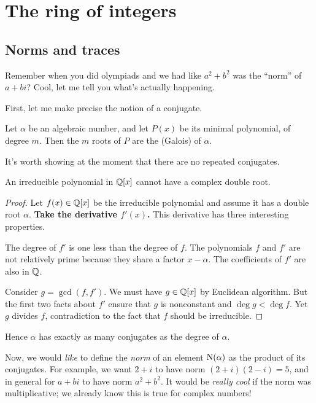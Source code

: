 \chapter{The ring of integers}
\label{ch:ring_of_integers}
\section{Norms and traces}
\label{sec:norms_traces}
Remember when you did olympiads and we had like $a^2+b^2$ was the ``norm'' of $a+bi$?
Cool, let me tell you what's actually happening.

First, let me make precise the notion of a conjugate.
\begin{definition}
	Let $\alpha$ be an algebraic number, and let $P(x)$ be its minimal polynomial,
	of degree $m$.
	Then the $m$ roots of $P$ are the (Galois)  of $\alpha$.
\end{definition}
It's worth showing at the moment that there are no repeated conjugates.
\begin{lemma}
	An irreducible polynomial in $\mathbb Q[x]$ cannot have a complex double root.
	\label{lem:irred_complex}
\end{lemma}
\begin{proof}
	Let $f(x) \in \mathbb Q[x]$ be the irreducible polynomial and assume it has a double root $\alpha$.
	\textbf{Take the derivative $f'(x)$.}
	This derivative has three interesting properties.
	\begin{itemize}
		\ii The degree of $f'$ is one less than the degree of $f$.
		\ii The polynomials $f$ and $f'$ are not relatively prime
		because they share a factor $x-\alpha$.
		\ii The coefficients of $f'$ are also in $\mathbb Q$.
	\end{itemize}
	Consider $g = \gcd(f, f')$. We must have $g \in \mathbb Q[x]$ by Euclidean algorithm.
	But the first two facts about $f'$ ensure that $g$ is nonconstant
	and $\deg g < \deg f$.
	Yet $g$ divides $f$,
	contradiction to the fact that $f$ should be irreducible.
\end{proof}
Hence $\alpha$ has exactly as many conjugates as the degree of $\alpha$.

Now, we would \emph{like} to define the \emph{norm} of an element $\operatorname{N}(\alpha)$
as the product of its conjugates.
For example, we want $2+i$ to have norm $(2+i)(2-i) = 5$,
and in general for $a+bi$ to have norm $a^2+b^2$.
It would be \emph{really cool} if the norm was multiplicative;
we already know this is true for complex numbers!

